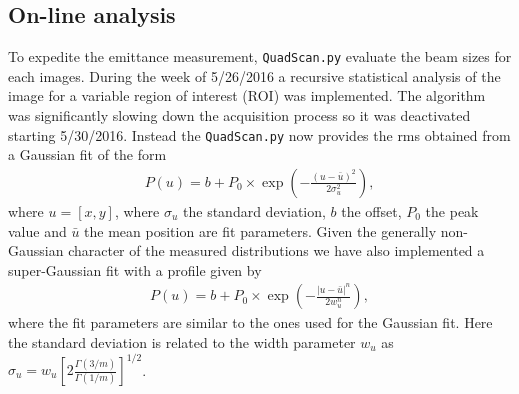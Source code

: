 \documentclass[notitlepage,twocolumn,nofootinbib,showpacs,preprintnumbers,superscriptaddress,amsmath,amssymb]{revtex4-1}
\begin{document}
\subsection{On-line analysis}
To expedite the emittance measurement, {\tt QuadScan.py} evaluate the beam sizes for each images. During the week of 5/26/2016 a 
recursive statistical analysis of the image for a variable region of interest (ROI) was implemented. The algorithm was significantly 
slowing down the acquisition process so it was deactivated starting 5/30/2016. Instead the {\tt QuadScan.py} now provides the rms obtained 
from a Gaussian fit of the form 
\begin{eqnarray}
P(u)=b+P_0\times \exp \left( -\frac{(u-\bar{u})^2}{2\sigma_u^2}\right), 
\end{eqnarray}
where $u=[x,y]$, where $\sigma_u$ the standard deviation, $b$ the offset, $P_0$ the peak value and $\bar{u}$ the mean position are fit parameters.  Given the generally non-Gaussian character of the measured distributions we have also implemented a super-Gaussian fit 
with a profile given by
\begin{eqnarray}
P(u)=b+P_0\times \exp \left( -\frac{|u-\bar{u}|^n}{2 w_u^n}\right), 
\end{eqnarray}
where the fit parameters are similar to the ones used for the Gaussian fit. Here the standard deviation is related to the width parameter
$w_u$ as $\sigma_u=w_u\left[2\frac{\Gamma(3/m)}{\Gamma(1/m)}\right]^{1/2}$. 
\end{document}
